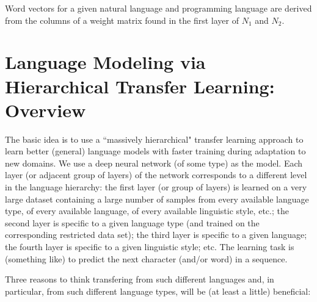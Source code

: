 \documentclass[12pt,letterpaper]{article}
\theoremstyle{remark}
\theoremstyle{plain}
\begin{document}
Word vectors for a given natural language and programming language are derived from the columns of a weight matrix found in the first layer of $N_{1}$ and $N_{2}$. 








\section{Language Modeling via Hierarchical Transfer Learning: Overview}

The basic idea is to use a ``massively hierarchical" transfer learning approach to learn better (general) language models with faster training during adaptation to new domains. We use a deep neural network (of some type) as the model. Each layer (or adjacent group of layers) of the network corresponds to a different level in the language hierarchy: the first layer (or group of layers) is learned on a very large dataset containing a large number of samples from every available language type, of every available language, of every available linguistic style, etc.; the second layer is specific to a given language type (and trained on the corresponding restricted data set); the third layer is specific to a given language; the fourth layer is specific to a given linguistic style; etc. The learning task is (something like) to predict the next character (and/or word) in a sequence. 

Three reasons to think transfering from such different languages and, in particular, from such different language types, will be (at least a little) beneficial: 
\end{document}
